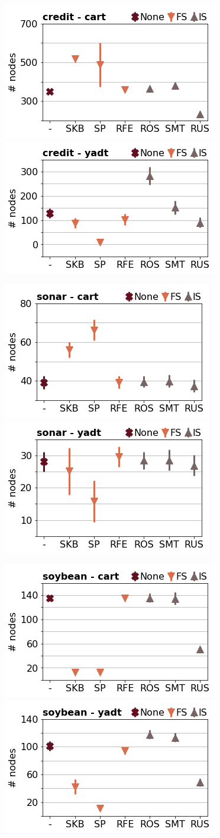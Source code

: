 \documentclass[runningheads,a4paper]{llncs}
\begin{document}
\begin{figure}[!h]
\includegraphics[width=0.32\linewidth]{fig/preps_credit_DT_sklearn_nbr_nodes.png}
\includegraphics[width=0.32\linewidth]{fig/preps_credit_DT_yadt_nbr_nodes.png}
\end{figure}


\begin{figure}[!h]
\includegraphics[width=0.32\linewidth]{fig/preps_sonar_DT_sklearn_nbr_nodes.png}
\includegraphics[width=0.32\linewidth]{fig/preps_sonar_DT_yadt_nbr_nodes.png}
\end{figure}


\begin{figure}[!h]
\includegraphics[width=0.32\linewidth]{fig/preps_soybean_DT_sklearn_nbr_nodes.png}
\includegraphics[width=0.32\linewidth]{fig/preps_soybean_DT_yadt_nbr_nodes.png}
\end{figure}
\end{document}
